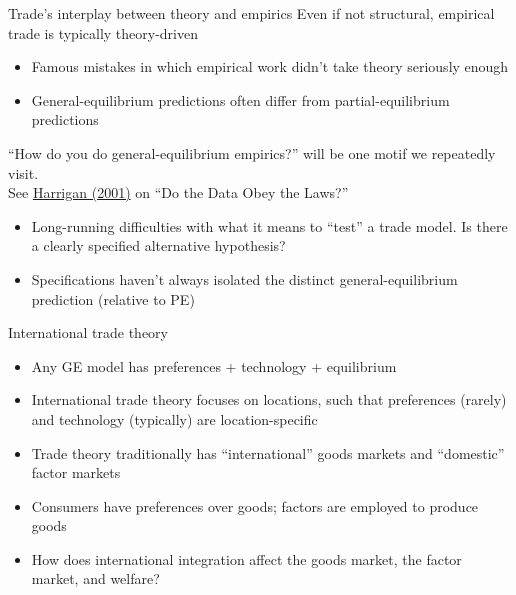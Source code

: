 \documentclass[10pt,notes=hide]{beamer}
\begin{document}
\begin{frame}{Trade's interplay between theory and empirics}
Even if not structural, empirical trade is typically theory-driven
\begin{itemize}
	\item Famous mistakes in which empirical work didn't take theory seriously enough
	\item General-equilibrium predictions often differ from partial-equilibrium predictions
\end{itemize}
``How do you do general-equilibrium empirics?'' will be one motif we repeatedly visit.\\
See \href{https://www.nber.org/papers/w8675}{Harrigan (2001)} on ``Do the Data Obey the Laws?''
\begin{itemize}
	\item Long-running difficulties with what it means to ``test'' a trade model.
	Is there a clearly specified alternative hypothesis?
	\item Specifications haven't always isolated the distinct general-equilibrium prediction (relative to PE)
\end{itemize}
\end{frame}
\begin{frame}{International trade theory}
\begin{itemize}
	\item Any GE model has preferences + technology + equilibrium
	\item International trade theory focuses on locations, such that preferences (rarely) and technology (typically) are location-specific
	\item Trade theory traditionally has ``international'' goods markets and ``domestic'' factor markets
	\item Consumers have preferences over goods; factors are employed to produce goods
	\item How does international integration affect the goods market, the factor market, and welfare?
\end{itemize}
\end{frame}
\end{document}
